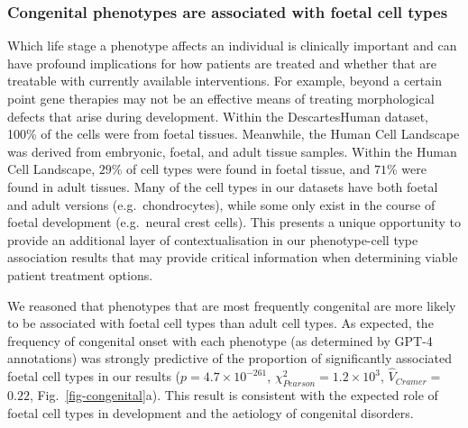 \documentclass[
]{article}
\begin{document}
\begin{figure}[H]
{}

\caption{\label{fig-celltype-severity-dot}}

\end{figure}%

\subsubsection{Congenital phenotypes are associated with foetal cell
types}\label{congenital-phenotypes-are-associated-with-foetal-cell-types}

Which life stage a phenotype affects an individual is clinically
important and can have profound implications for how patients are
treated and whether that are treatable with currently available
interventions. For example, beyond a certain point gene therapies may
not be an effective means of treating morphological defects that arise
during development. Within the DescartesHuman dataset, 100\% of the
cells were from foetal tissues. Meanwhile, the Human Cell Landscape was
derived from embryonic, foetal, and adult tissue samples. Within the
Human Cell Landscape, \(29\)\% of cell types were found in foetal
tissue, and \(71\)\% were found in adult tissues. Many of the cell types
in our datasets have both foetal and adult versions (e.g.~chondrocytes),
while some only exist in the course of foetal development (e.g.~neural
crest cells). This presents a unique opportunity to provide an
additional layer of contextualisation in our phenotype-cell type
association results that may provide critical information when
determining viable patient treatment options.

We reasoned that phenotypes that are most frequently congenital are more
likely to be associated with foetal cell types than adult cell types. As
expected, the frequency of congenital onset with each phenotype (as
determined by GPT-4 annotations) was strongly predictive of the
proportion of significantly associated foetal cell types in our results
(\(p=\)\(4.7 \times 10^{-261}\),
\(\chi^2_{Pearson}=\)\(1.2 \times 10^{3}\),
\(\hat{V}_{Cramer}=\)\(0.22\), Fig.~\ref{fig-congenital}a). This result
is consistent with the expected role of foetal cell types in development
and the aetiology of congenital disorders.
\end{document}
